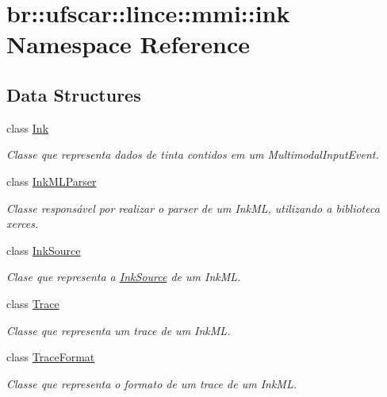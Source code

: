 \hypertarget{namespacebr_1_1ufscar_1_1lince_1_1mmi_1_1ink}{
\section{br::ufscar::lince::mmi::ink Namespace Reference}
\label{namespacebr_1_1ufscar_1_1lince_1_1mmi_1_1ink}
}
\subsection*{Data Structures}
\begin{DoxyCompactItemize}
\item 
class \hyperlink{classbr_1_1ufscar_1_1lince_1_1mmi_1_1ink_1_1Ink}{Ink}
\begin{DoxyCompactList}\small\item\em Classe que representa dados de tinta contidos em um MultimodalInputEvent. \item\end{DoxyCompactList}\item 
class \hyperlink{classbr_1_1ufscar_1_1lince_1_1mmi_1_1ink_1_1InkMLParser}{InkMLParser}
\begin{DoxyCompactList}\small\item\em Classe responsável por realizar o parser de um InkML, utilizando a biblioteca xerces. \item\end{DoxyCompactList}\item 
class \hyperlink{classbr_1_1ufscar_1_1lince_1_1mmi_1_1ink_1_1InkSource}{InkSource}
\begin{DoxyCompactList}\small\item\em Clase que representa a \hyperlink{classbr_1_1ufscar_1_1lince_1_1mmi_1_1ink_1_1InkSource}{InkSource} de um InkML. \item\end{DoxyCompactList}\item 
class \hyperlink{classbr_1_1ufscar_1_1lince_1_1mmi_1_1ink_1_1Trace}{Trace}
\begin{DoxyCompactList}\small\item\em Classe que representa um trace de um InkML. \item\end{DoxyCompactList}\item 
class \hyperlink{classbr_1_1ufscar_1_1lince_1_1mmi_1_1ink_1_1TraceFormat}{TraceFormat}
\begin{DoxyCompactList}\small\item\em Classe que representa o formato de um trace de um InkML. \item\end{DoxyCompactList}\item 

\end{DoxyCompactItemize}
